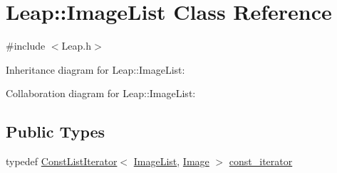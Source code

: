 \hypertarget{class_leap_1_1_image_list}{}\section{Leap\+:\+:Image\+List Class Reference}
\label{class_leap_1_1_image_list}


{\ttfamily \#include $<$Leap.\+h$>$}



Inheritance diagram for Leap\+:\+:Image\+List\+:


Collaboration diagram for Leap\+:\+:Image\+List\+:
\subsection*{Public Types}
\begin{DoxyCompactItemize}
\item 
typedef \hyperlink{class_leap_1_1_const_list_iterator}{Const\+List\+Iterator}$<$ \hyperlink{class_leap_1_1_image_list}{Image\+List}, \hyperlink{class_leap_1_1_image}{Image} $>$ \hyperlink{class_leap_1_1_image_list_ae3c17a6b8ac23853649ba93abd5a1dbe}{const\+\_\+iterator}
\end{DoxyCompactItemize}
